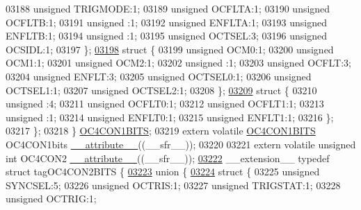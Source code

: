 \begin{DoxyCode}
03188       \textcolor{keywordtype}{unsigned} TRIGMODE:1;
03189       \textcolor{keywordtype}{unsigned} OCFLTA:1;
03190       \textcolor{keywordtype}{unsigned} OCFLTB:1;
03191       \textcolor{keywordtype}{unsigned} :1;
03192       \textcolor{keywordtype}{unsigned} ENFLTA:1;
03193       \textcolor{keywordtype}{unsigned} ENFLTB:1;
03194       \textcolor{keywordtype}{unsigned} :1;
03195       \textcolor{keywordtype}{unsigned} OCTSEL:3;
03196       \textcolor{keywordtype}{unsigned} OCSIDL:1;
03197     \};
\hypertarget{a00009_source_l03198}{}\hyperlink{a00009}{03198}     \textcolor{keyword}{struct }\{
03199       \textcolor{keywordtype}{unsigned} OCM0:1;
03200       \textcolor{keywordtype}{unsigned} OCM1:1;
03201       \textcolor{keywordtype}{unsigned} OCM2:1;
03202       \textcolor{keywordtype}{unsigned} :1;
03203       \textcolor{keywordtype}{unsigned} OCFLT:3;
03204       \textcolor{keywordtype}{unsigned} ENFLT:3;
03205       \textcolor{keywordtype}{unsigned} OCTSEL0:1;
03206       \textcolor{keywordtype}{unsigned} OCTSEL1:1;
03207       \textcolor{keywordtype}{unsigned} OCTSEL2:1;
03208     \};
\hypertarget{a00009_source_l03209}{}\hyperlink{a00009}{03209}     \textcolor{keyword}{struct }\{
03210       \textcolor{keywordtype}{unsigned} :4;
03211       \textcolor{keywordtype}{unsigned} OCFLT0:1;
03212       \textcolor{keywordtype}{unsigned} OCFLT1:1;
03213       \textcolor{keywordtype}{unsigned} :1;
03214       \textcolor{keywordtype}{unsigned} ENFLT0:1;
03215       \textcolor{keywordtype}{unsigned} ENFLT1:1;
03216     \};
03217   \};
03218 \} \hyperlink{a00008_d3/dd6/a00624}{OC4CON1BITS};
03219 \textcolor{keyword}{extern} \textcolor{keyword}{volatile} \hyperlink{a00008_d3/dd6/a00624}{OC4CON1BITS} OC4CON1bits \hyperlink{a00009_a493c46f03454991ccc5aa7a6e1dfb2a7}{\_\_attribute\_\_}((\_\_sfr\_\_));
03220 
03221 \textcolor{keyword}{extern} \textcolor{keyword}{volatile} \textcolor{keywordtype}{unsigned} \textcolor{keywordtype}{int}  OC4CON2 \hyperlink{a00009_a493c46f03454991ccc5aa7a6e1dfb2a7}{\_\_attribute\_\_}((\_\_sfr\_\_));
\hypertarget{a00009_source_l03222}{}\hyperlink{a00008}{03222} \_\_extension\_\_ \textcolor{keyword}{typedef} \textcolor{keyword}{struct }tagOC4CON2BITS \{
\hypertarget{a00009_source_l03223}{}\hyperlink{a00009}{03223}   \textcolor{keyword}{union }\{
\hypertarget{a00009_source_l03224}{}\hyperlink{a00009}{03224}     \textcolor{keyword}{struct }\{
03225       \textcolor{keywordtype}{unsigned} SYNCSEL:5;
03226       \textcolor{keywordtype}{unsigned} OCTRIS:1;
03227       \textcolor{keywordtype}{unsigned} TRIGSTAT:1;
03228       \textcolor{keywordtype}{unsigned} OCTRIG:1;

\end{DoxyCode}
